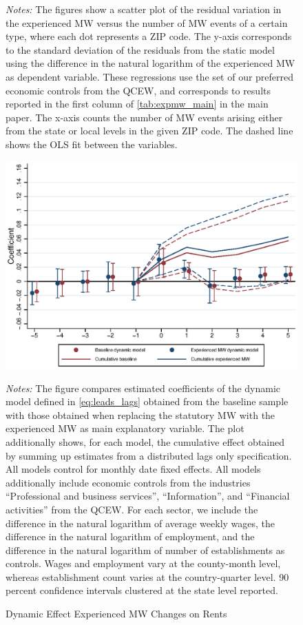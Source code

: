 \begin{figure}[htb!]
\begin{minipage}{0.95\textwidth}
		\vspace{3mm}	
		\textit{Notes:} The figures show a scatter plot of the residual variation in the 
		experienced MW versus the number of MW events of a certain type, where each dot represents 
		a ZIP code. The y-axis corresponds to the standard deviation of the residuals from the static 
		model using the difference in the natural logarithm of the experienced MW as dependent variable. 
		These regressions use the set of our preferred economic controls from the QCEW, and corresponds 
		to results reported in the first column of \autoref{tab:expmw_main} in the main paper. The 
		x-axis counts the number of MW events arising either from the state or local levels in the 
		given ZIP code. The dashed line shows the OLS fit between the variables.
	\end{minipage}
\end{figure}

\begin{figure}[!h]
	\centering
	\caption{Dynamic Effect Experienced MW Changes on Rents}
	\label{fig:expmw_dynamic}
	\includegraphics[width = .75\textwidth]
		{../../analysis/first_differences_expmw/output/fd_model_comparison_expmw.eps}
	\begin{minipage}{.95\textwidth}\footnotesize
		\textit{Notes:} The figure compares estimated coefficients of the dynamic model defined in 
		\autoref{eq:leads_lags} obtained from the baseline sample with those obtained when replacing 
		the statutory MW with the experienced MW as main explanatory variable. The plot additionally 
		shows, for each model, the cumulative effect obtained by summing up estimates from a 
		distributed lags only specification. All models control for monthly date fixed effects. 
		All models additionally include economic controls from the industries ``Professional and 
		business services'', ``Information'', and ``Financial activities'' from the QCEW. For each
		sector, we include the difference in the natural logarithm of average weekly wages, the 
		difference in the natural logarithm of employment, and the difference in the natural 
		logarithm of number of establishments as controls. Wages and employment vary at the 
		county-month level, whereas establishment count varies at the country-quarter level.
		90 percent confidence intervals clustered at the state level reported. 
	\end{minipage}
\end{figure}

